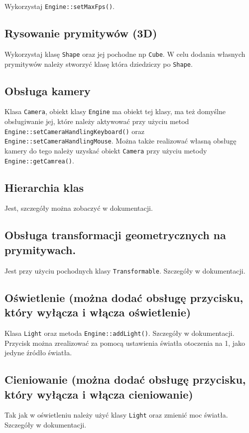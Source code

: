 \documentclass[11pt]{article}
\begin{document}
Wykorzystaj \texttt{Engine::setMaxFps()}.
\subsection{Rysowanie prymitywów (3D)}
\label{sec:org357f7e9}

Wykorzystaj klasę \texttt{Shape} oraz jej pochodne np \texttt{Cube}. W celu dodania własnych prymitywów należy stworzyć klasę która dziedziczy po \texttt{Shape}.
\subsection{Obsługa kamery}
\label{sec:orgca9255e}

Klasa \texttt{Camera}, obiekt klasy \texttt{Engine} ma obiekt tej klasy, ma też domyślne obsługiwanie jej, które należy aktywować przy użyciu metod
\texttt{Engine::setCameraHandlingKeyboard()} oraz \texttt{Engine::setCameraHandlingMouse}.
Można także realizować własną obsługę kamery do tego należy uzyskać obiekt \texttt{Camera} przy użyciu metody \texttt{Engine::getCamrea()}.
\subsection{Hierarchia klas}
\label{sec:org61fab68}
Jest, szczegóły można zobaczyć w dokumentacji.
\subsection{Obsługa transformacji geometrycznych na prymitywach.}
\label{sec:org465e502}

Jest przy użyciu pochodnych klasy \texttt{Transformable}. Szczegóły w dokumentacji.
\subsection{Oświetlenie (można dodać obsługę przycisku, który wyłącza i włącza oświetlenie)}
\label{sec:org355ebe8}

Klasa \texttt{Light} oraz metoda \texttt{Engine::addLight()}. Szczegóły w dokumentacji.
Przycisk można zrealizować za pomocą ustawienia światła otoczenia na 1, jako jedyne źródło światła.
\subsection{Cieniowanie (można dodać obsługę przycisku, który wyłącza i włącza cieniowanie)}
\label{sec:org599b4b9}

Tak jak w oświetleniu należy użyć klasy \texttt{Light} oraz zmienić moc światła. Szczegóły w dokumentacji.
\end{document}
